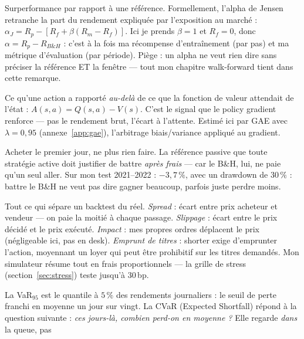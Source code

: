 \documentclass[11pt,a4paper]{article}
\begin{document}
\begin{description}[itemsep=4pt, font=\normalfont\bfseries]
  \item[Alpha] Surperformance par rapport à une référence. Formellement, l'alpha de
        Jensen retranche la part du rendement expliquée par l'exposition au marché :
        $\alpha_J = R_p - [R_f + \beta(R_m - R_f)]$. Ici je prends $\beta = 1$ et
        $R_f = 0$, donc $\alpha = R_p - R_{B\&H}$ : c'est à la fois ma récompense
        d'entraînement (par pas) et ma métrique d'évaluation (par période). Piège :
        un alpha ne veut rien dire sans préciser la référence ET la fenêtre --- tout
        mon chapitre walk-forward tient dans cette remarque.
  \item[Avantage ($A_t$)] Ce qu'une action a rapporté \emph{au-delà} de ce que la
        fonction de valeur attendait de l'état : $A(s,a) = Q(s,a) - V(s)$. C'est le
        signal que le policy gradient renforce --- pas le rendement brut, l'écart à
        l'attente. Estimé ici par GAE avec $\lambda = 0{,}95$
        (annexe~\ref{app:gae}), l'arbitrage biais/variance appliqué au gradient.
  \item[Buy \& Hold (B\&H)] Acheter le premier jour, ne plus rien faire. La référence
        passive que toute stratégie active doit justifier de battre \emph{après
        frais} --- car le B\&H, lui, ne paie qu'un seul aller. Sur mon test
        2021--2022 : $-3{,}7\,\%$, avec un drawdown de $30\,\%$ : battre le B\&H ne
        veut pas dire gagner beaucoup, parfois juste perdre moins.
  \item[Coûts de friction] Tout ce qui sépare un backtest du réel. \emph{Spread} :
        écart entre prix acheteur et vendeur --- on paie la moitié à chaque passage.
        \emph{Slippage} : écart entre le prix décidé et le prix exécuté.
        \emph{Impact} : mes propres ordres déplacent le prix (négligeable ici, pas en
        desk). \emph{Emprunt de titres} : shorter exige d'emprunter l'action, moyennant
        un loyer qui peut être prohibitif sur les titres demandés. Mon simulateur
        résume tout en frais proportionnels --- la grille de stress
        (section~\ref{sec:stress}) teste jusqu'à 30\,bp.
  \item[CVaR$_{95}$ / VaR$_{95}$] La VaR$_{95}$ est le quantile à $5\,\%$ des
        rendements journaliers : le seuil de perte franchi en moyenne un jour sur
        vingt. La CVaR (Expected Shortfall) répond à la question suivante : \emph{ces
        jours-là, combien perd-on en moyenne ?} Elle regarde \emph{dans} la queue, pas

\end{description}
\end{document}
